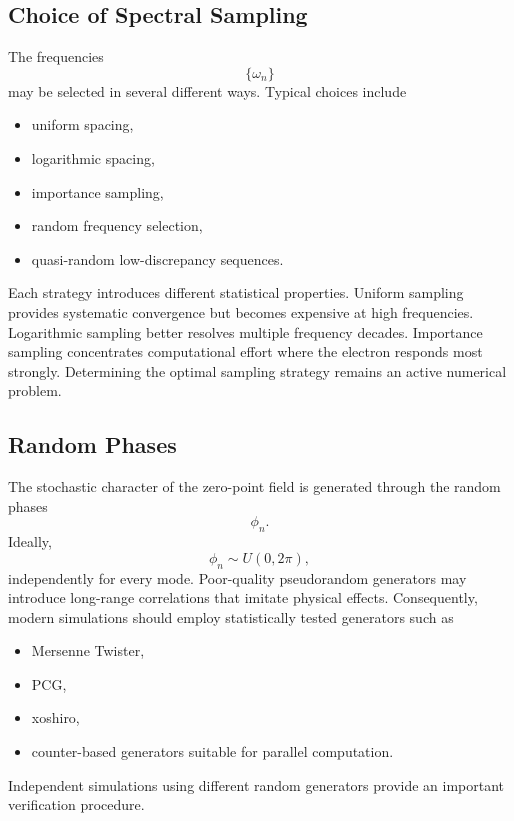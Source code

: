 \subsection{Choice of Spectral Sampling}
The frequencies
\[\{\omega_n\}\]
may be selected in several different ways.
Typical choices include
\begin{itemize}
\item
uniform spacing,
\item
logarithmic spacing,
\item
importance sampling,
\item
random frequency selection,
\item
quasi-random low-discrepancy sequences.
\end{itemize}
Each strategy introduces different statistical properties.
Uniform sampling provides systematic convergence but becomes expensive
at high frequencies.
Logarithmic sampling better resolves multiple frequency decades.
Importance sampling concentrates computational effort where the electron
responds most strongly.
Determining the optimal sampling strategy remains an active numerical
problem.
\subsection{Random Phases}
The stochastic character of the zero-point field is generated through
the random phases
\[\phi_n.\]
Ideally,
\[\phi_n\sim U(0,2\pi),\]
independently for every mode.
Poor-quality pseudorandom generators may introduce long-range
correlations that imitate physical effects.
Consequently,
modern simulations should employ statistically tested generators such
as
\begin{itemize}
\item
Mersenne Twister,
\item
PCG,
\item
xoshiro,
\item
counter-based generators suitable for parallel computation.
\end{itemize}
Independent simulations using different random generators provide an
important verification procedure.
